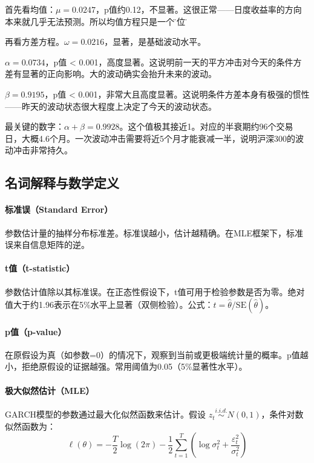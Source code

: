 \documentclass[11pt,a4paper]{article}
\begin{document}
首先看均值：\(\mu = 0.0247\)，p值约0.12，不显著。这很正常——日度收益率的方向本来就几乎无法预测。所以均值方程只是一个\"占位\"。

再看方差方程。\(\omega = 0.0216\)，显著，是基础波动水平。

\(\alpha = 0.0734\)，p值 < 0.001，高度显著。这说明前一天的平方冲击对今天的条件方差有显著的正向影响。大的波动确实会抬升未来的波动。

\(\beta = 0.9195\)，p值 < 0.001，非常大且高度显著。这说明条件方差本身有极强的惯性——昨天的波动状态很大程度上决定了今天的波动状态。

最关键的数字：\(\alpha + \beta = 0.9928\)。这个值极其接近1。对应的半衰期约96个交易日，大概4.6个月。一次波动冲击需要将近5个月才能衰减一半，说明沪深300的波动冲击非常持久。

\subsection*{名词解释与数学定义}

\paragraph{标准误（Standard Error）} 参数估计量的抽样分布标准差。标准误越小，估计越精确。在MLE框架下，标准误来自信息矩阵的逆。

\paragraph{t值（t-statistic）} 参数估计值除以其标准误。在正态性假设下，t值可用于检验参数是否为零。绝对值大于约1.96表示在5\%水平上显著（双侧检验）。公式：\(t = \hat{\theta} / \text{SE}(\hat{\theta})\)。

\paragraph{p值（p-value）} 在原假设为真（如参数=0）的情况下，观察到当前或更极端统计量的概率。p值越小，拒绝原假设的证据越强。常用阈值为0.05（5\%显著性水平）。

\paragraph{极大似然估计（MLE）} GARCH模型的参数通过最大化似然函数来估计。假设 \(z_t \stackrel{i.i.d.}{\sim} N(0,1)\)，条件对数似然函数为：
\[
\ell(\theta) = -\frac{T}{2}\log(2\pi) - \frac{1}{2}\sum_{t=1}^{T}\left(\log\sigma_t^2 + \frac{\varepsilon_t^2}{\sigma_t^2}\right)
\]
\end{document}
